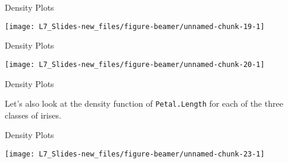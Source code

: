 \documentclass[ignorenonframetext,]{beamer}
\newenvironment{Shaded}{\begin{snugshade}}{\end{snugshade}}
\newcommand{\KeywordTok}[1]{\textcolor{white}{\textbf{{#1}}}}
\newcommand{\NormalTok}[1]{\textcolor{yellow}{{#1}}}
\newcommand{\DataTypeTok}[1]{\textcolor{yellow}{{#1}}}
\newcommand{\StringTok}[1]{\textcolor{yellow}{{#1}}}
\begin{document}
\begin{frame}[fragile]{Density Plots}

\small

\begin{Shaded}
\end{Shaded}

\begin{center}\texttt{[image: L7\_Slides-new\_files/figure-beamer/unnamed-chunk-19-1]} \end{center}

\end{frame}

\begin{frame}[fragile]{Density Plots}

\small

\begin{Shaded}
\end{Shaded}

\begin{center}\texttt{[image: L7\_Slides-new\_files/figure-beamer/unnamed-chunk-20-1]} \end{center}

\end{frame}

\begin{frame}[fragile]{Density Plots}

Let's also look at the density function of \texttt{Petal.Length} for
each of the three classes of irises.

\small

\small

\end{frame}

\begin{frame}{Density Plots}

\small

\begin{center}\texttt{[image: L7\_Slides-new\_files/figure-beamer/unnamed-chunk-23-1]} \end{center}

\end{frame}
\end{document}

